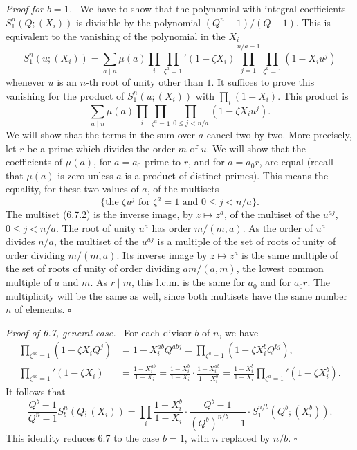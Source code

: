 \documentclass[10pt]{article}
\theoremstyle{deligne}
\newenvironment{proofdel}[1][Proof.]{\textit{#1}\ }{\hfill$\square$}
\begin{document}
\begin{proofdel}[Proof for $b=1$.]
We have to show that the polynomial with integral coefficients $S_1^n(Q;(X_i))$ is divisible by the polynomial $(Q^n-1)/(Q-1)$. This is equivalent to the vanishing of the polynomial in the $X_i$
\[
S_1^n(u;(X_i))=\sum_{a\mid n}\mu(a)\prod_i\prod_{\zeta^a=1}'(1-\zeta X_i)
\prod_{j=1}^{n/a-1}\prod_{\zeta^a=1}(1-X_iu^j)
\]
whenever $u$ is an $n$-th root of unity other than $1$. It suffices to prove this vanishing for the product of $S_1^n(u;(X_i))$ with $\prod_i(1-X_i)$. This product is
\begin{equation}\tag{6.7.1}
\sum_{a\mid n}\mu(a)\prod_i\prod_{\zeta^a=1}\prod_{0\le j<n/a}(1-\zeta X_i u^j).
\end{equation}
We will show that the terms in the sum over $a$ cancel two by two. More precisely, let $r$ be a prime which divides the order $m$ of $u$. We will show that the coefficients of $\mu(a)$, for $a=a_0$ prime to $r$, and for $a=a_0r$, are equal (recall that $\mu(a)$ is zero unless $a$ is a product of distinct primes). This means the equality, for these two values of $a$, of the multisets
\begin{equation}\tag{6.7.2}
\{\text{the }\zeta u^j\text{ for }\zeta^a=1\text{ and }0\le j<n/a\}.
\end{equation}
The multiset (6.7.2) is the inverse image, by $z\mapsto z^a$, of the multiset of the $u^{aj}$, $0\le j<n/a$. The root of unity $u^a$ has order $m/(m,a)$. As the order of $u^a$ divides $n/a$, the multiset of the $u^{aj}$ is a multiple of the set of roots of unity of order dividing $m/(m,a)$. Its inverse image by $z\mapsto z^a$ is the same multiple of the set of roots of unity of order dividing $am/(a,m)$, the lowest common multiple of $a$ and $m$. As $r\mid m$, this l.c.m. is the same for $a_0$ and for $a_0r$. The multiplicity will be the same as well, since both multisets have the same number $n$ of elements.
\end{proofdel}

\begin{proofdel}[Proof of 6.7, general case.]
For each divisor $b$ of $n$, we have
\begin{align*}
\prod_{\zeta^{ab}=1}(1-\zeta X_iQ^j)&=1-X_i^{ab}Q^{abj}=\prod_{\zeta^a=1}(1-\zeta X_i^bQ^{bj}),\\
\prod_{\zeta^{ab}=1}'(1-\zeta X_i)&=\frac{1-X_i^{ab}}{1-X_i}
=\frac{1-X_i^b}{1-X_i}\cdot\frac{1-X_i^{ab}}{1-X_i^b}
=\frac{1-X_i^b}{1-X_i}\prod_{\zeta^a=1}'(1-\zeta X_i^b).
\end{align*}
It follows that
\[
\frac{Q^b-1}{Q^n-1}S_b^n(Q;(X_i))
=\prod_i\frac{1-X_i^b}{1-X_i}\cdot
\frac{Q^b-1}{(Q^b)^{n/b}-1}\cdot S_1^{n/b}(Q^b;(X_i^b)).
\]
This identity reduces 6.7 to the case $b=1$, with $n$ replaced by $n/b$.
\end{proofdel}
\end{document}
